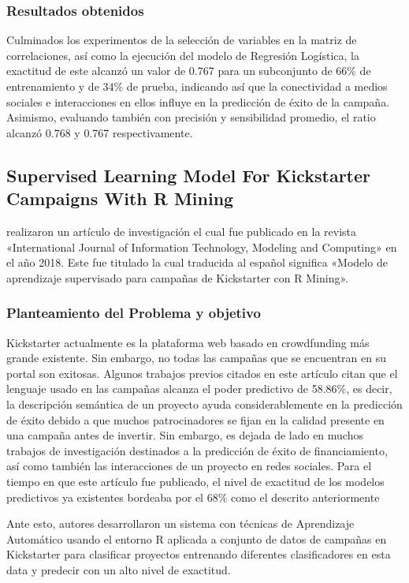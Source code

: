 \subsubsection{Resultados obtenidos}
Culminados los experimentos de la selección de variables en la matriz de correlaciones, así como la ejecución del modelo de Regresión Logística, la exactitud de este alcanzó un valor de 0.767 para un subconjunto de 66\% de entrenamiento y de 34\% de prueba, indicando así que la conectividad a medios sociales e interacciones en ellos influye en la predicción de éxito de la campaña. Asimismo, evaluando también con precisión y sensibilidad promedio, el ratio alcanzó 0.768 y 0.767 respectivamente.

\subsection{Supervised Learning Model For Kickstarter Campaigns With R Mining \citep*{pr_kamath2018suplearn}}
\citeauthor{pr_kamath2018suplearn} realizaron un artículo de investigación el cual fue publicado en la revista «International Journal of Information Technology, Modeling and Computing» en el año 2018. Este fue titulado  la cual traducida al español significa «Modelo de aprendizaje supervisado para campañas de Kickstarter con R Mining».

\subsubsection{Planteamiento del Problema y objetivo}
Kickstarter actualmente es la plataforma web basado en crowdfunding más grande existente. Sin embargo, no todas las campañas que se encuentran en su portal son exitosas. Algunos trabajos previos citados en este artículo citan que el lenguaje usado en las campañas alcanza el poder predictivo de 58.86\%, es decir, la descripción semántica de un proyecto ayuda considerablemente en la predicción de éxito debido a que muchos patrocinadores se fijan en la calidad presente en una campaña antes de invertir.  Sin embargo, es dejada de lado en muchos trabajos de investigación destinados a la predicción de éxito de financiamiento, así como también las interacciones de un proyecto en redes sociales. Para el tiempo en que este artículo fue publicado, el nivel de exactitud de los modelos predictivos ya existentes bordeaba por el 68\% como el descrito anteriormente

Ante esto, autores desarrollaron un sistema con técnicas de Aprendizaje Automático usando el entorno R aplicada a conjunto de datos de campañas en Kickstarter para clasificar proyectos entrenando diferentes clasificadores en esta data y predecir con un alto nivel de exactitud.

